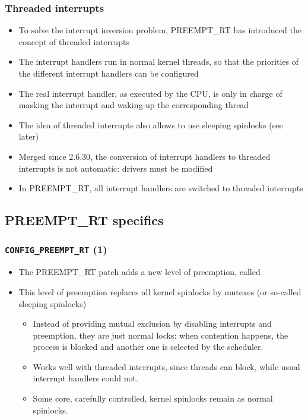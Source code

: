 \begin{frame}
  \frametitle{Threaded interrupts}
  \begin{itemize}
  \item To solve the interrupt inversion problem, PREEMPT\_RT has
    introduced the concept of threaded interrupts
  \item The interrupt handlers run in normal kernel threads, so that
    the priorities of the different interrupt handlers can be
    configured
  \item The real interrupt handler, as executed by the CPU, is only in
    charge of masking the interrupt and waking-up the corresponding
    thread
  \item The idea of threaded interrupts also allows to use sleeping
    spinlocks (see later)
  \item Merged since 2.6.30, the conversion of interrupt handlers to
    threaded interrupts is not automatic: drivers must be modified
  \item In PREEMPT\_RT, all interrupt handlers are switched to
    threaded interrupts
  \end{itemize}
\end{frame}

\subsection{PREEMPT\_RT specifics}

\begin{frame}
  \frametitle{{\tt CONFIG\_PREEMPT\_RT} (1)}
  \begin{itemize}
  \item The PREEMPT\_RT patch adds a new level of preemption, called
  \item This level of preemption replaces all kernel spinlocks by
    mutexes (or so-called sleeping spinlocks)
    \begin{itemize}
    \item Instead of providing mutual exclusion by disabling
      interrupts and preemption, they are just normal locks: when
      contention happens, the process is blocked and another one is
      selected by the scheduler.
    \item Works well with threaded interrupts, since threads can
      block, while usual interrupt handlers could not.
    \item Some core, carefully controlled, kernel spinlocks remain as
      normal spinlocks.
    \end{itemize}
  \end{itemize}
\end{frame}

